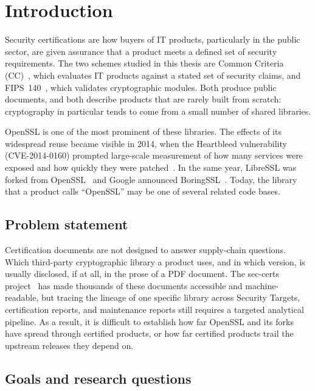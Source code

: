 \chapter*{Introduction}

Security certifications are how buyers of IT products, particularly
in the public sector, are given assurance that a product meets a defined
set of security requirements. The two schemes studied in this thesis are
Common Criteria (CC)~\cite{iso15408}, which evaluates IT products
against a stated set of security claims, and FIPS~140~\cite{fips1402,fips1403},
which validates cryptographic modules. Both produce public documents, and
both describe products that are rarely built from scratch: cryptography
in particular tends to come from a small number of shared libraries.

OpenSSL is one of the most prominent of these libraries. The effects of
its widespread reuse became visible in 2014, when the Heartbleed
vulnerability (CVE-2014-0160) prompted large-scale measurement of how
many services were exposed and how quickly they were
patched~\cite{durumeric2014heartbleed}. In the same year, LibreSSL was
forked from OpenSSL~\cite{libressl} and Google announced
BoringSSL~\cite{langley2014boringssl}. Today, the library that a product
calls ``OpenSSL'' may be one of several related code bases.

\section*{Problem statement}

Certification documents are not designed to answer supply-chain questions.
Which third-party cryptographic library a product uses, and in which
version, is usually disclosed, if at all, in the prose of a PDF
document. The sec-certs project~\cite{janovsky2024seccerts} has made
thousands of these documents accessible and machine-readable, but tracing
the lineage of one specific library across Security Targets, certification
reports, and maintenance reports still requires a targeted analytical
pipeline. As a result, it is difficult to establish how far OpenSSL and
its forks have spread through certified products, or how far certified
products trail the upstream releases they depend on.

\section*{Goals and research questions}


